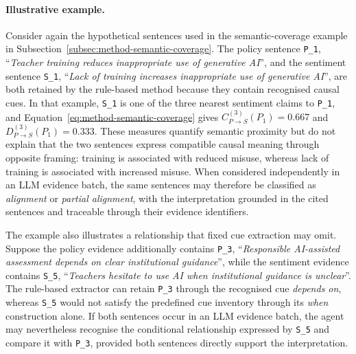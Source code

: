 {\color{blue}
\paragraph{Illustrative example.}
Consider again the hypothetical sentences used in the semantic-coverage example in
Subsection~\ref{subsec:method-semantic-coverage}. The policy sentence \texttt{P\_1},
``\textit{Teacher training reduces inappropriate use of generative AI}'', and the
sentiment sentence \texttt{S\_1}, ``\textit{Lack of training increases inappropriate
use of generative AI}'', are both retained by the rule-based method because they
contain recognised causal cues. In that example, \texttt{S\_1} is one of the three
nearest sentiment claims to \texttt{P\_1}, and
Equation~\ref{eq:method-semantic-coverage} gives $C_{P\rightarrow
S}^{(3)}(P_1)=0.667$ and $D_{P\rightarrow S}^{(3)}(P_1)=0.333$. These measures
quantify semantic proximity but do not explain that the two sentences express
compatible causal meaning through opposite framing: training is associated with
reduced misuse, whereas lack of training is associated with increased misuse. When
considered independently in an LLM evidence batch, the same sentences may therefore
be classified as \textit{alignment} or \textit{partial alignment}, with the
interpretation grounded in the cited sentences and traceable through their evidence
identifiers.

The example also illustrates a relationship that fixed cue extraction may omit.
Suppose the policy evidence additionally contains \texttt{P\_3},
``\textit{Responsible AI-assisted assessment depends on clear institutional
guidance}'', while the sentiment evidence contains \texttt{S\_5}, ``\textit{Teachers
hesitate to use AI when institutional guidance is unclear}''. The rule-based
extractor can retain \texttt{P\_3} through the recognised cue \textit{depends on},
whereas \texttt{S\_5} would not satisfy the predefined cue inventory through its
\textit{when} construction alone. If both sentences occur in an LLM evidence batch,
the agent may nevertheless recognise the conditional relationship expressed by
\texttt{S\_5} and compare it with \texttt{P\_3}, provided both sentences directly
support the interpretation.

}
